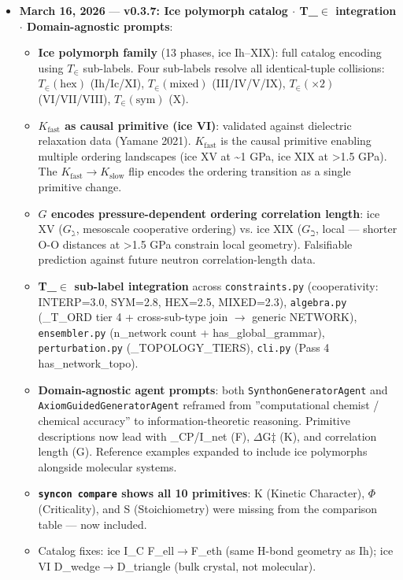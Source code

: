 \documentclass[12pt,a4paper]{article}
\begin{document}
\begin{itemize}
    \item 
    \textbf{March 16, 2026} --- \textbf{v0.3.7: Ice polymorph catalog $\cdot$ T\_$\in$ integration $\cdot$ Domain-agnostic prompts}:

    \begin{itemize}
    \item \textbf{Ice polymorph family} (13 phases, ice Ih--XIX): full catalog encoding using $T_{\in}$ sub-labels. Four sub-labels resolve all identical-tuple collisions: $T_{\in}(\text{hex})$ (Ih/Ic/XI), $T_{\in}(\text{mixed})$ (III/IV/V/IX), $T_{\in}(\times 2)$ (VI/VII/VIII), $T_{\in}(\text{sym})$ (X).
    \item \textbf{$K_{\text{fast}}$ as causal primitive (ice VI)}: validated against dielectric relaxation data (Yamane 2021). $K_{\text{fast}}$ is the causal primitive enabling multiple ordering landscapes (ice XV at \textasciitilde{}1 GPa, ice XIX at \textgreater{}1.5 GPa). The $K_{\text{fast}} \to K_{\text{slow}}$ flip encodes the ordering transition as a single primitive change.
    \item \textbf{$G$ encodes pressure-dependent ordering correlation length}: ice XV ($G_{\gimel}$, mesoscale cooperative ordering) vs. ice XIX ($G_{\beth}$, local --- shorter O-O distances at \textgreater{}1.5 GPa constrain local geometry). Falsifiable prediction against future neutron correlation-length data.
    \item \textbf{T\_$\in$ sub-label integration} across \texttt{constraints.py} (cooperativity: INTERP=3.0, SYM=2.8, HEX=2.5, MIXED=2.3), \texttt{algebra.py} (\_T\_ORD tier 4 + cross-sub-type join $\rightarrow$ generic NETWORK), \texttt{ensembler.py} (n\_network count + has\_global\_grammar), \texttt{perturbation.py} (\_TOPOLOGY\_TIERS), \texttt{cli.py} (Pass 4 has\_network\_topo).
    \item \textbf{Domain-agnostic agent prompts}: both \texttt{SynthonGeneratorAgent} and \texttt{AxiomGuidedGeneratorAgent} reframed from ''computational chemist / chemical accuracy'' to information-theoretic reasoning. Primitive descriptions now lead with \xi\_CP/I\_net (F), $\Delta$G‡ (K), and correlation length (G). Reference examples expanded to include ice polymorphs alongside molecular systems.
    \item \textbf{\texttt{syncon compare} shows all 10 primitives}: K (Kinetic Character), $\Phi$ (Criticality), and S (Stoichiometry) were missing from the comparison table --- now included.
    \item Catalog fixes: ice I\_C F\_ell$\rightarrow$F\_eth (same H-bond geometry as Ih); ice VI D\_wedge$\rightarrow$D\_triangle (bulk crystal, not molecular).
\end{itemize}


\end{itemize}
\end{document}
